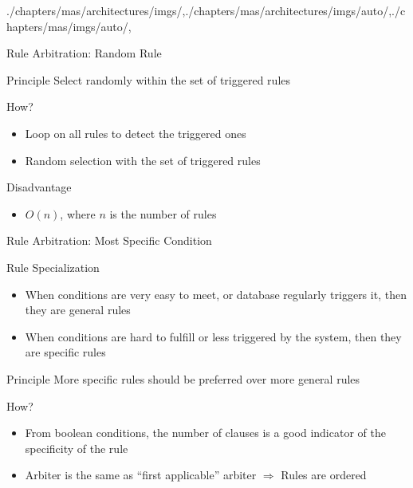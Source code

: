 \begin{graphicspathcontext}{{./chapters/mas/architectures/imgs/},{./chapters/mas/architectures/imgs/auto/},{./chapters/mas/imgs/auto/},\old}
\begin{frame}{{Rule Arbitration:} Random Rule}
	\begin{block}{Principle}
		Select randomly within the set of triggered rules
	\end{block}
	\begin{block}{How?}
		\begin{itemize}
			\item Loop on all rules to detect the triggered ones
			\item Random selection with the set of triggered rules
		\end{itemize}
	\end{block}
	\begin{alertblock}{Disadvantage}
		\begin{itemize}
			\item $O(n)$, where $n$ is the number of rules
		\end{itemize}
	\end{alertblock}
\end{frame}

\begin{frame}{{Rule Arbitration:} Most Specific Condition}
	\begin{definitionblock}{Rule Specialization}
	\begin{itemize}
		\item When conditions are very easy to meet, or database regularly triggers it, then they are general rules
		\item When conditions are hard to fulfill or less triggered by the system, then they are specific rules
	\end{itemize}
	\end{definitionblock}
	\begin{block}{Principle}
		More specific rules should be preferred over more general rules
	\end{block}
	\begin{block}{How?}
		\begin{itemize}
			\item From boolean conditions, the number of clauses is a good indicator of the specificity of the rule
			\item Arbiter is the same as ``first applicable'' arbiter $\Rightarrow$ Rules are ordered 
		\end{itemize}
	\end{block}
\end{frame}


\end{graphicspathcontext}
